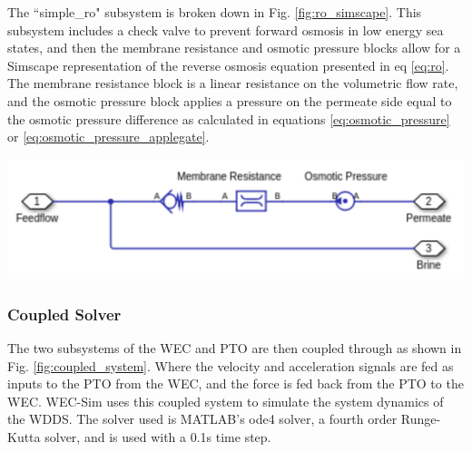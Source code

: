 \documentclass[twocolumn,10pt]{asme2e}
\begin{document}
The ``simple\_ro" subsystem is broken down in Fig. \ref{fig:ro_simscape}. This subsystem includes a check valve to prevent forward osmosis in low energy sea states, and then the membrane resistance and osmotic pressure blocks allow for a Simscape representation of the reverse osmosis equation presented in eq \ref{eq:ro}. The membrane resistance block is a linear resistance on the volumetric flow rate, and the osmotic pressure block applies a pressure on the permeate side equal to the osmotic pressure difference as calculated in equations \ref{eq:osmotic_pressure} or \ref{eq:osmotic_pressure_applegate}.

\begin{center}
    \includegraphics[width=\linewidth]{../figs/desalsimscape.pdf}
    \label{fig:ro_simscape}
\end{center}

\subsubsection{Coupled Solver}

The two subsystems of the WEC and PTO are then coupled through as shown in Fig. \ref{fig:coupled_system}. Where the velocity and acceleration signals are fed as inputs to the PTO from the WEC, and the force is fed back from the PTO to the WEC. WEC-Sim uses this coupled system to simulate the system dynamics of the WDDS. The solver used is MATLAB's ode4 solver, a fourth order Runge-Kutta solver, and is used with a 0.1s time step. 
\end{document}
